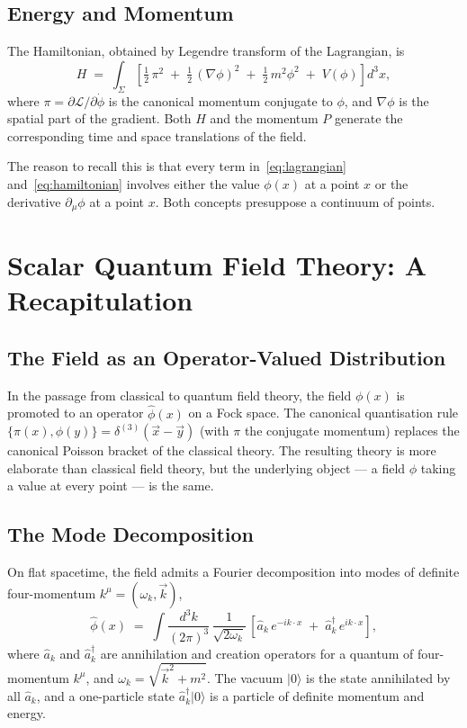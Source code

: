 \documentclass[11pt]{article}
\newcommand{\ket}[1]{|#1\rangle}
\begin{document}
\subsection{Energy and Momentum}

The Hamiltonian, obtained by Legendre transform of the Lagrangian, is
\begin{equation}
H \;=\; \int_\Sigma \left[\tfrac{1}{2}\, \pi^2 \;+\; \tfrac{1}{2}\, (\nabla \phi)^2 \;+\; \tfrac{1}{2}\, m^2 \phi^2 \;+\; V(\phi) \right] d^3x,
\label{eq:hamiltonian}
\end{equation}
where $\pi = \partial \mathcal{L} / \partial \dot \phi$ is the canonical momentum conjugate to $\phi$, and $\nabla \phi$ is the spatial part of the gradient. Both $H$ and the momentum $P$ generate the corresponding time and space translations of the field.

The reason to recall this is that every term in~\eqref{eq:lagrangian} and~\eqref{eq:hamiltonian} involves either the value $\phi(x)$ at a point $x$ or the derivative $\partial_\mu \phi$ at a point $x$. Both concepts presuppose a continuum of points.

\section{Scalar Quantum Field Theory: A Recapitulation}
\label{sec:qft}

\subsection{The Field as an Operator-Valued Distribution}

In the passage from classical to quantum field theory, the field $\phi(x)$ is promoted to an operator $\hat{\phi}(x)$ on a Fock space. The canonical quantisation rule $\{\pi(x), \phi(y)\} = \delta^{(3)}(\vec{x} - \vec{y})$ (with $\pi$ the conjugate momentum) replaces the canonical Poisson bracket of the classical theory. The resulting theory is more elaborate than classical field theory, but the underlying object --- a field $\phi$ taking a value at every point --- is the same.

\subsection{The Mode Decomposition}

On flat spacetime, the field admits a Fourier decomposition into modes of definite four-momentum $k^\mu = (\omega_k, \vec{k})$,
\begin{equation}
\hat{\phi}(x) \;=\; \int \frac{d^3k}{(2\pi)^3}\,\frac{1}{\sqrt{2\omega_k}}\,
\left[ \hat{a}_k\, e^{-i k \cdot x} \;+\; \hat{a}_k^\dagger\, e^{i k \cdot x} \right],
\label{eq:mode}
\end{equation}
where $\hat{a}_k$ and $\hat{a}_k^\dagger$ are annihilation and creation operators for a quantum of four-momentum $k^\mu$, and $\omega_k = \sqrt{\vec{k}^2 + m^2}$. The vacuum $\ket{0}$ is the state annihilated by all $\hat{a}_k$, and a one-particle state $\hat{a}_k^\dagger \ket{0}$ is a particle of definite momentum and energy.
\end{document}
